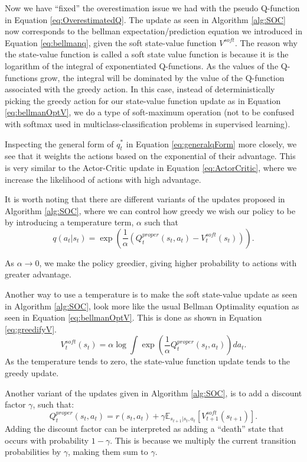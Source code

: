 \documentclass{report}
\numberwithin{equation}{section}
\numberwithin{figure}{section}
\numberwithin{table}{section}
\numberwithin{algorithm}{section}
\begin{document}
Now we have ``fixed'' the overestimation issue we had with the 
pseudo Q-function in Equation \ref{eq:OverestimatedQ}. The update 
as seen in Algorithm \ref{alg:SOC} now corresponds to the 
bellman expectation/prediction equation we introduced
in Equation \ref{eq:bellmanq}, given the soft state-value function 
$V^{soft}$. The reason why the state-value function is called a 
soft state value function is because it is the logarithm 
of the integral of exponentiated Q-functions. As the values 
of the Q-functions grow, the integral will be dominated by 
the value of the Q-function associated with the greedy action. In this 
case, instead of deterministically picking the greedy action 
for our state-value function update as in Equation \ref{eq:bellmanOptV}, 
we do a type of soft-maximum operation (not to be confused with softmax 
used in multiclass-classification problems in supervised learning).

Inspecting the general form of $q^*_t$ in Equation \ref{eq:generalqForm}
more closely, we see that it weights the actions based on the
exponential of their advantage. This is very similar to the 
Actor-Critic update in Equation \ref{eq:ActorCritic}, where 
we increase the 
likelihood of actions with high advantage.

It is worth noting that there are different variants of 
the updates proposed in Algorithm \ref{alg:SOC}, where 
we can control how greedy we wish our policy to be by 
introducing a temperature term, $\alpha$ such that 
\begin{equation*}
  q(a_t|s_t)=\exp(\frac{1}{\alpha}(Q^{proper}_t(s_t,a_t)-V^{soft}_t(s_t))).  
\end{equation*}

As $\alpha\rightarrow 0$, we make the policy greedier, giving 
higher probability to actions with greater advantage.

Another way to use a temperature is to make the soft state-value 
update as seen in Algorithm \ref{alg:SOC}, look more like the 
usual Bellman Optimality equation as seen in Equation \ref{eq:bellmanOptV}.
This is done as shown in Equation \ref{eq:greedifyV}.
\begin{equation}\label{eq:greedifyV}
  V^{soft}_t(s_t)=\alpha \log \int \exp(\frac{1}{\alpha}Q^{proper}_t(s_t,a_t))da_t.
\end{equation}
As the temperature tends to zero, the state-value function update 
tends to the greedy update.

Another variant of the updates given in Algorithm \ref{alg:SOC}, 
is to add a discount factor $\gamma$, such that:
\begin{equation*}
  Q^{proper}_t(s_t,a_t)=r(s_t,a_t) + \gamma \mathbb{E}_{s_{t+1}|s_t,a_t}[V^{soft}_{t+1}(s_{t+1})].
\end{equation*}
Adding the discount factor can be interpreted as adding a ``death'' 
state that occurs with probability $1-\gamma$. This is because 
we multiply the current transition probabilities by $\gamma$, making 
them sum to $\gamma$.
\end{document}
